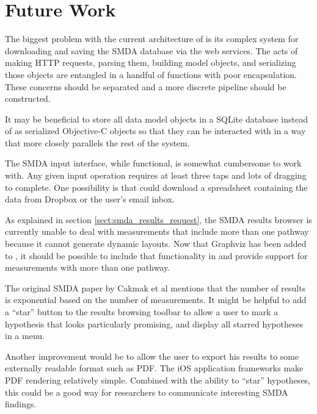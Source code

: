 \section{Future Work}
\label{sect:maw_future_work}

The biggest problem with the current architecture of \mawapp is its complex
system for downloading and saving the SMDA database via the web services. The
acts of making HTTP requests, parsing them, building model objects, and
serializing those objects are entangled in a handful of functions with poor
encapsulation. These concerns should be separated and a more discrete pipeline
should be constructed.

It may be beneficial to store all data model objects in a SQLite database
instead of as serialized Objective-C objects so that they can be interacted with
in a way that more closely parallels the rest of the \pathcasemaw system.

The SMDA input interface, while functional, is somewhat cumbersome to work with.
Any given input operation requires at least three taps and lots of dragging to
complete. One possibility is that \mawapp could download a spreadsheet
containing the data from Dropbox or the user's email inbox.

As explained in section \ref{sect:smda_results_request}, the SMDA results
browser is currently unable to deal with measurements that include more than one
pathway because it cannot generate dynamic layouts. Now that Graphviz has been
added to \keggapp, it should be possible to include that functionality in
\mawapp and provide support for measurements with more than one pathway.

The original SMDA paper by Cakmak et al \cite{smda-basic} mentions that the
number of results is exponential based on the number of measurements. It might
be helpful to add a ``star'' button to the results browsing toolbar to allow a
user to mark a hypothesis that looks particularly promising, and display all
starred hypotheses in a menu.

Another improvement would be to allow the user to export his results to some
externally readable format such as PDF. The iOS application frameworks make PDF
rendering relatively simple. Combined with the ability to ``star'' hypotheses,
this could be a good way for researchers to communicate interesting SMDA
findings.
